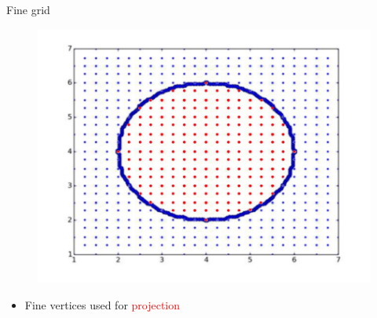 \begin{frame}
\begin{overlayarea}{\textwidth}{0.9\textheight}
\begin{minipage}{0.45\textwidth}
	\begin{block}{\centering Fine grid}
	\vspace{-0.5cm}
	\begin{figure}
	\includegraphics[scale=0.35]{Pictures/DC/DC_1_Fine.pdf}
	\end{figure}
	\begin{itemize}
	\item Fine vertices used for \textcolor{red}{projection}
	\end{itemize}
	\end{block}
	\end{minipage}
\end{overlayarea}
\end{frame}


